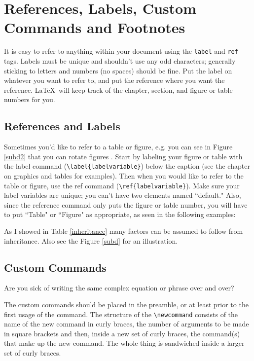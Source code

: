 \documentclass[12pt,twoside]{reedthesis}
\begin{document}
           		

\clearpage
\section{References, Labels, Custom Commands and Footnotes}
It is easy to refer to anything within your document using the \texttt{label} and \texttt{ref} tags.  Labels must be unique and shouldn't use any odd characters; generally sticking to letters and numbers (no spaces) should be fine. Put the label on whatever you want to refer to, and put the reference where you want the reference. \LaTeX\ will keep track of the chapter, section, and figure or table numbers for you. 

\subsection{References and Labels}
Sometimes you'd like to refer to a table or figure, e.g. you can see in Figure \ref{subd2} that you can rotate figures . Start by labeling your figure or table with the label command (\verb=\label{labelvariable}=) below the caption (see the chapter on graphics and tables for examples). Then when you would like to refer to the table or figure, use the ref command (\verb=\ref{labelvariable}=). Make sure your label variables are unique; you can't have two elements named ``default." Also, since the reference command only puts the figure or table number, you will have to put  ``Table" or ``Figure" as appropriate, as seen in the following examples:

 As I showed in Table \ref{inheritance} many factors can be assumed to follow from inheritance. Also see the Figure \ref{subd} for an illustration.
 
\subsection{Custom Commands}\label{commands}
Are you sick of writing the same complex equation or phrase over and over? 

The custom commands should be placed in the preamble, or at least prior to the first usage of the command. The structure of the \verb=\newcommand= consists of the name of the new command in curly braces, the number of arguments to be made in square brackets and then, inside a new set of curly braces, the command(s) that make up the new command. The whole thing is sandwiched inside a larger set of curly braces. 
\newcommand{\hydro}{H$_2$SO$_4$}
\end{document}
